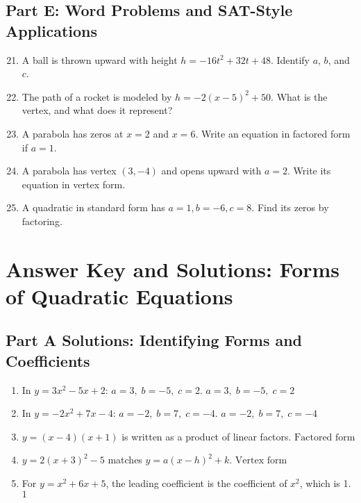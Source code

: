 \documentclass[12pt]{article}
\begin{document}
\subsection*{Part E: Word Problems and SAT-Style Applications}
\begin{enumerate}
  \setcounter{enumi}{20}
  \item A ball is thrown upward with height \(h = -16t^2 + 32t + 48\). Identify \(a\), \(b\), and \(c\).
  \item The path of a rocket is modeled by \(h = -2(x - 5)^2 + 50\). What is the vertex, and what does it represent?
  \item A parabola has zeros at \(x = 2\) and \(x = 6\). Write an equation in factored form if \(a = 1.\)
  \item A parabola has vertex \((3, -4)\) and opens upward with \(a = 2\). Write its equation in vertex form.
  \item A quadratic in standard form has \(a = 1, b = -6, c = 8.\) Find its zeros by factoring.
\end{enumerate}

\newpage


\section*{Answer Key and Solutions: Forms of Quadratic Equations}

\subsection*{Part A Solutions: Identifying Forms and Coefficients}
\begin{enumerate}
  \item In \(y = 3x^2 - 5x + 2\):  
  \(a = 3,\; b = -5,\; c = 2.\)  
  \(\boxed{a=3,\; b=-5,\; c=2}\)

  \item In \(y = -2x^2 + 7x - 4\):  
  \(a = -2,\; b = 7,\; c = -4.\)  
  \(\boxed{a=-2,\; b=7,\; c=-4}\)

  \item \(y = (x - 4)(x + 1)\) is written as a product of linear factors.  
  \(\boxed{\text{Factored form}}\)

  \item \(y = 2(x + 3)^2 - 5\) matches \(y = a(x - h)^2 + k.\)  
  \(\boxed{\text{Vertex form}}\)

  \item For \(y = x^2 + 6x + 5\), the leading coefficient is the coefficient of \(x^2\), which is 1.  
  \(\boxed{1}\)
\end{enumerate}
\end{document}
